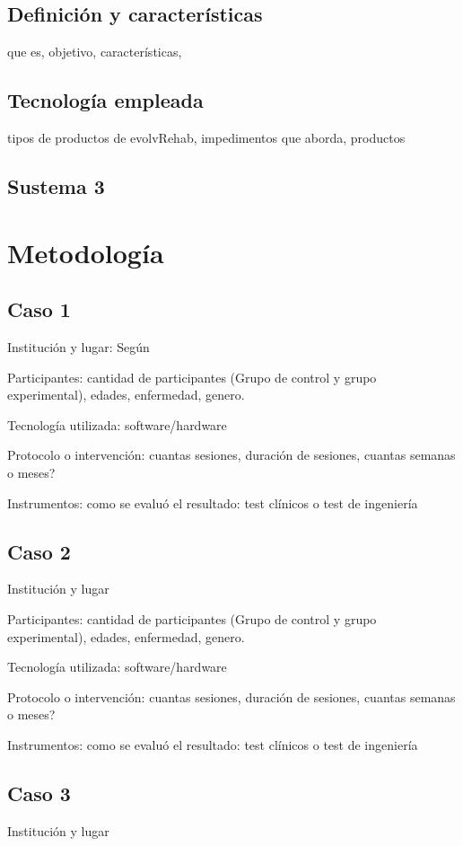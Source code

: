 \documentclass[journal]{IEEEtran}
\begin{document}
\subsection{Definición y características}
que es, objetivo,  características, 
\subsection{Tecnología empleada}
tipos de productos de evolvRehab, impedimentos que aborda, productos
\subsection{Sustema 3}



\section{Metodología}
\subsection{Caso 1}
Institución y lugar: Según \cite{Cedric}

Participantes: cantidad de participantes (Grupo de control y grupo experimental), edades, enfermedad, genero.

Tecnología utilizada: software/hardware 

Protocolo o intervención: cuantas sesiones, duración de sesiones, cuantas semanas o meses?

Instrumentos: como se evaluó el resultado: test clínicos o test de ingeniería 

\subsection{Caso 2}
Institución y lugar

Participantes: cantidad de participantes (Grupo de control y grupo experimental), edades, enfermedad, genero.

Tecnología utilizada: software/hardware 

Protocolo o intervención: cuantas sesiones, duración de sesiones, cuantas semanas o meses?

Instrumentos: como se evaluó el resultado: test clínicos o test de ingeniería 


\subsection{Caso 3}
Institución y lugar
\end{document}
